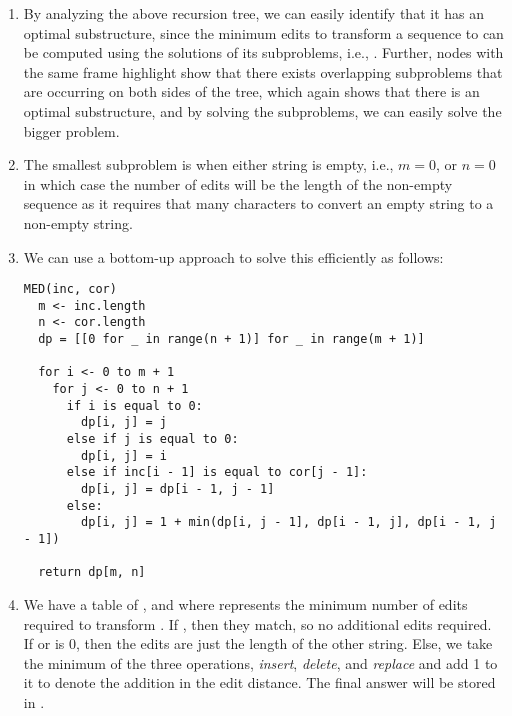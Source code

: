 \documentclass[addpoints]{exam}
\begin{document}
\begin{questions}
\begin{solution}
        \begin{enumerate}
          \item By analyzing the above recursion tree, we can easily identify that it has an optimal substructure, since the minimum edits to transform a sequence  to  can be computed using the solutions of its subproblems, i.e., . Further, nodes with the same frame highlight show that there exists overlapping subproblems that are occurring on both sides of the tree, which again shows that there is an optimal substructure, and by solving the subproblems, we can easily solve the bigger problem.
          \item The smallest subproblem is when either string is empty, i.e., $m = 0$, or $n = 0$ in which case the number of edits will be the length of the non-empty sequence as it requires that many characters to convert an empty string to a non-empty string.
          \item We can use a bottom-up approach to solve this efficiently as follows:
          \begin{lstlisting}
MED(inc, cor)
  m <- inc.length
  n <- cor.length
  dp = [[0 for _ in range(n + 1)] for _ in range(m + 1)]

  for i <- 0 to m + 1
    for j <- 0 to n + 1
      if i is equal to 0:
        dp[i, j] = j
      else if j is equal to 0:
        dp[i, j] = i
      else if inc[i - 1] is equal to cor[j - 1]:
        dp[i, j] = dp[i - 1, j - 1]
      else:
        dp[i, j] = 1 + min(dp[i, j - 1], dp[i - 1, j], dp[i - 1, j - 1])

  return dp[m, n]
\end{lstlisting}
          \item We have a table of , and where  represents the minimum number of edits required to transform . If , then they match, so no additional edits required. If  or  is 0, then the edits are just the length of the other string. Else, we take the minimum of the three operations, \textit{insert}, \textit{delete}, and \textit{replace} and add 1 to it to denote the addition in the edit distance. The final answer will be stored in .
          

\end{enumerate}
\end{solution}
\end{questions}
\end{document}
